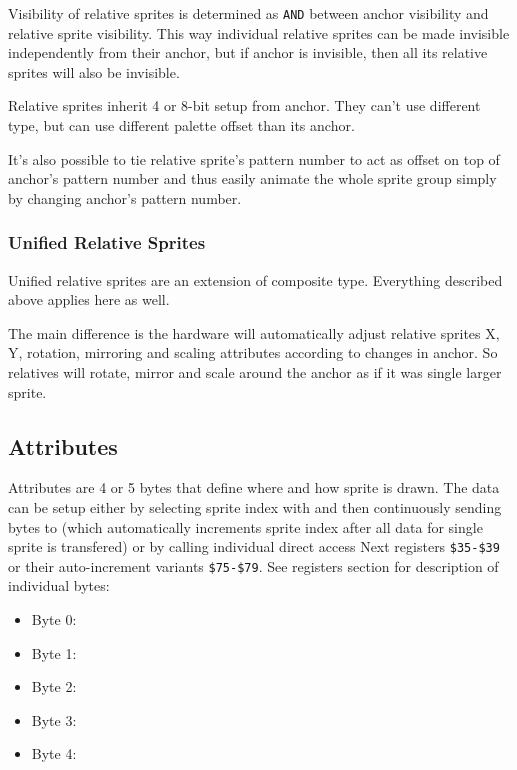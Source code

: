 \documentclass[12pt,twoside,openright,a4paper]{book}
\begin{document}
Visibility of relative sprites is determined as {\tt AND} between anchor visibility and relative sprite visibility. This way individual relative sprites can be made invisible independently from their anchor, but if anchor is invisible, then all its relative sprites will also be invisible.

Relative sprites inherit 4 or 8-bit setup from anchor. They can't use different type, but can use different palette offset than its anchor.

It's also possible to tie relative sprite's pattern number to act as offset on top of anchor's pattern number and thus easily animate the whole sprite group simply by changing anchor's pattern number.

\subsubsection{Unified Relative Sprites}

Unified relative sprites are an extension of composite type. Everything described above applies here as well.

The main difference is the hardware will automatically adjust relative sprites X, Y, rotation, mirroring and scaling attributes according to changes in anchor. So relatives will rotate, mirror and scale around the anchor as if it was single larger sprite.

\subsection{Attributes}

Attributes are 4 or 5 bytes that define where and how sprite is drawn. The data can be setup either by selecting sprite index with  and then continuously sending bytes to  (which automatically increments sprite index after all data for single sprite is transfered) or by calling individual direct access Next registers {\tt \$35-\$39} or their auto-increment variants {\tt \$75-\$79}. See registers section for description of individual bytes:

\begin{itemize}[topsep=1pt,itemsep=1pt]
	\item Byte 0: 
	\item Byte 1: 
	\item Byte 2: 
	\item Byte 3: 
	\item Byte 4: 
\end{itemize}
\end{document}
